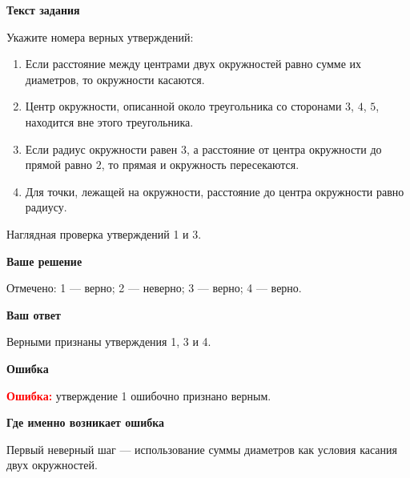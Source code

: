 \documentclass[12pt,a4paper]{article}
\newcommand{\errorlabel}{\textcolor{red}{\textbf{Ошибка:}}}
\newcommand{\subhead}[1]{\par\medskip\textbf{#1}\par}
\begin{document}
\subhead{Текст задания}
Укажите номера верных утверждений:
\begin{enumerate}
\item Если расстояние между центрами двух окружностей равно сумме их диаметров, то окружности касаются.
\item Центр окружности, описанной около треугольника со сторонами $3$, $4$, $5$, находится вне этого треугольника.
\item Если радиус окружности равен $3$, а расстояние от центра окружности до прямой равно $2$, то прямая и окружность пересекаются.
\item Для точки, лежащей на окружности, расстояние до центра окружности равно радиусу.
\end{enumerate}


\begin{center}

\small Наглядная проверка утверждений 1 и 3.
\end{center}

\subhead{Ваше решение}
Отмечено: 1 --- верно; 2 --- неверно; 3 --- верно; 4 --- верно.

\subhead{Ваш ответ}
Верными признаны утверждения 1, 3 и 4.

\subhead{Ошибка}
\errorlabel{} утверждение 1 ошибочно признано верным.

\subhead{Где именно возникает ошибка}
Первый неверный шаг --- использование суммы диаметров как условия касания двух окружностей.
\end{document}
